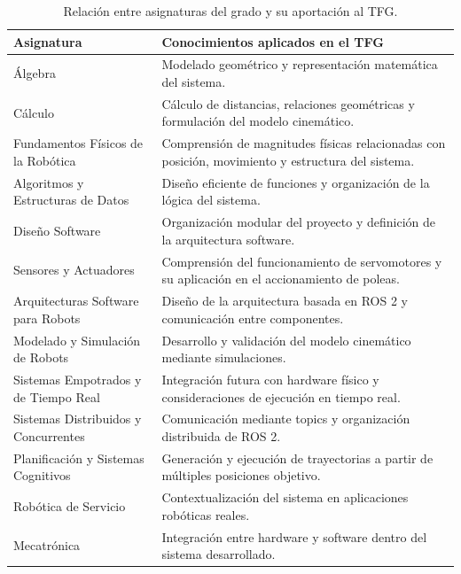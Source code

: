 \begin{table}[htbp]
    \centering
    \label{tab:mi_tabla}
    \begin{tabularx}{\textwidth}{@{}X X @{}}
        \toprule
        Asignatura & Conocimientos aplicados en el TFG \\
        \midrule
        Álgebra & Modelado geométrico y representación matemática del sistema.\newline \\
        Cálculo & Cálculo de distancias, relaciones geométricas y formulación del modelo cinemático.\newline \\
        Fundamentos Físicos de la Robótica & Comprensión de magnitudes físicas relacionadas con posición, movimiento y estructura del sistema.\newline \\
        Algoritmos y Estructuras de Datos & Diseño eficiente de funciones y organización de la lógica del sistema.\newline \\
        Diseño Software & Organización modular del proyecto y definición de la arquitectura software.\newline \\
        Sensores y Actuadores & Comprensión del funcionamiento de servomotores y su aplicación en el accionamiento de poleas.\newline \\
        Arquitecturas Software para Robots & Diseño de la arquitectura basada en ROS 2 y comunicación entre componentes.\newline \\
        Modelado y Simulación de Robots & Desarrollo y validación del modelo cinemático mediante simulaciones.\newline \\
        Sistemas Empotrados y de Tiempo Real & Integración futura con hardware físico y consideraciones de ejecución en tiempo real.\newline \\
        Sistemas Distribuidos y Concurrentes & Comunicación mediante topics y organización distribuida de ROS 2.\newline \\
        Planificación y Sistemas Cognitivos & Generación y ejecución de trayectorias a partir de múltiples posiciones objetivo.\newline \\
        Robótica de Servicio & Contextualización del sistema en aplicaciones robóticas reales.\newline \\
        Mecatrónica & Integración entre hardware y software dentro del sistema desarrollado. \\
        \bottomrule
    \end{tabularx}
    \caption{Relación entre asignaturas del grado y su aportación al TFG.}
\end{table}


